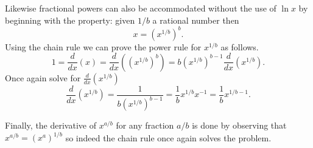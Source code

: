 \documentclass[12pt]{article}
\begin{document}
Likewise fractional powers can also be accommodated without the use of $\ln x$ by beginning with the property: given $1/b$ a rational number then
\[ x= (x^{1/b})^{b}.\]
Using the chain rule we can prove the power rule for $x^{1/b}$ as follows.
\[
1 = \frac{d}{dx}(x) = \frac{d}{dx}((x^{1/b})^b)
 = b(x^{1/b})^{b-1} \frac{d}{dx}(x^{1/b}).
\]
Once again solve for $\frac{d}{dx}(x^{1/b})$
\[
\frac{d}{dx}(x^{1/b})=\frac{1}{b (x^{1/b})^{b-1}}=\frac{1}{b} x^{1/b} x^{-1}
=\frac{1}{b} x^{1/b-1}.
\]

Finally, the derivative of $x^{a/b}$ for any fraction $a/b$ is done by observing that $x^{a/b}=(x^a)^{1/b}$ so indeed the chain rule once again solves the problem.
\end{document}
